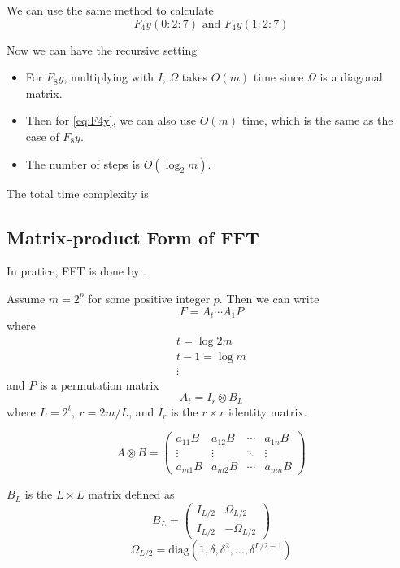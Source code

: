 We can use the same method to calculate \begin{equation}
    F_4 y(0: 2 : 7) \mbox{ and } F_4 y(1: 2 : 7) \label{eq:F4y}
\end{equation}

Now we can have the recursive setting \begin{itemize}
    \item For $F_8y$, multiplying with $I$, $\Omega$ takes $O(m)$ time since $\Omega$ is a diagonal matrix.
    \item Then for \eqref{eq:F4y}, we can also use $O(m)$ time, which is the same as the case of $F_8y$.
    \item The number of steps is $O(\log_2 m)$.
\end{itemize}
The total time complexity is 

\subsection{Matrix-product Form of FFT}

In pratice, FFT is done by .

\begin{definition}
    Assume $m = 2^p$ for some positive integer $p$. Then we can write \[
        F = A_t \cdots A_1 P
    \]
    where \begin{gather*}
    t = \log 2m \\
    t -1 = \log m \\
    \vdots
    \end{gather*}
    and $P$ is a permutation matrix \[
        A_t = I_r \otimes B_L
    \]
    where $L = 2^{t},\ r = 2m / L$, and $I_r$ is the $r \times r$ identity matrix.
    
    \begin{notation}
        \[
            A \otimes B = \begin{pmatrix}
                a_{11}B & a_{12}B & \cdots & a_{1n}B \\
                \vdots & \vdots & \ddots & \vdots \\
                a_{m1}B & a_{m2}B & \cdots & a_{mn}B
            \end{pmatrix}
        \]
    \end{notation}
    
    $B_L$ is the $L \times L$ matrix defined as \[
        B_L = \begin{pmatrix}
            I_{L/2} & \Omega_{L/2} \\
            I_{L/2} & -\Omega_{L/2}
        \end{pmatrix}
    \]\[
        \Omega_{L/2} = \text{diag}(1, \delta, \delta^2, \dots, \delta^{L/2 - 1})
    \]
\end{definition}

